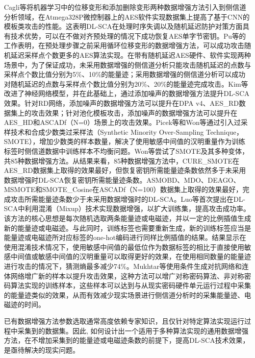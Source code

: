 {	Cagli等\citep{Cagli17}将机器学习中的位移变形和添加删除变形两种数据增强方法引入到侧信道分析领域，在Atmega328P微控制器上的AES软件实现数据集上提高了基于CNN的模板类攻击的性能。这表明DL-SCA在处理时序失调以及随机延迟防护对策方面具有技术优势，可以在不做对齐预处理的情况下成功恢复AES单字节密钥。Pu等\citep{Pu17}的工作表明，在预处理步骤之前采用循环位移变形的数据增强方法，可以成功攻击随机延迟采样点个数更多的AES算法实现。在带有随机延迟AES硬件、软件实现两种场景中，为了保证成功，未采用数据增强的侧信道分析只能攻击随机延迟的点数与采样点个数比值分别为5\%、10\%的能量迹；采用数据增强的侧信道分析可以成功对随机延迟的点数与采样点个数比值分别为20\%、20\%的能量迹完成攻击。Kim等\citep{Kim19}改进了神经网络模型，并在此基础上，通过添加噪声的数据增强方法提升DL-SCA效果。针对RD网络，添加噪声的数据增强方法可以提升在DPA v4、AES\_RD数据集上的攻击效果；针对池化模板攻击，添加噪声的数据增强方法可以提升在AES\_HD和ASCADf（N=0）场景上的攻击效果。Picek等\citep{Picek19}和Won等\citep{Won20}通过引入过采样技术和合成少数类过采样法（Synthetic Minority Over-Sampling Technique， SMOTE），增加少数类的样本数量，解决了使用敏感中间值的汉明重量作为训练标签时侧信道数据中训练样本不均衡问题。Won等\citep{Won20}尝试了SMOTE及其多种变体，共85种数据增强方法\citep{Kovcs19}。从结果来看，85种数据增强方法中，CURE\_SMOTE在AES\_RD数据集上取得的效果最好，但恢复密钥所需能量迹条数依然多于未采用数据增强时DL-SCA恢复密钥所需能量迹条数。ASMOBD、MDO、DEAGO、MSMOTE和SMOTE\_Cosine在ASCADf（N=100）数据集上取得的效果最好，完成攻击所需能量迹条数少于未采用数据增强时的DL-SCA\chenggongtiaoshu 。Luo等\citep{Luo21}首次提出在DL-SCA中利用混淆（Mixup）技术实现数据增强，以扩大训练集，提高攻击成功率。该方法的核心思想是每次随机选取两条能量迹或电磁迹，并以一定的比例插值生成新的能量迹或电磁迹。与此同时，训练标签也需要重新生成，新的训练标签应当是能量迹或电磁迹所对应标签的one-hot编码进行同样比例插值的结果。结果显示在使用混淆技术情况下，使用敏感中间值的最低位作为数据标签的相比于直接使用敏感中间值或敏感中间值的汉明重量可以取得更好的效果，在使用相同数量的能量迹进行攻击的情况下，猜测熵最多减少74\%。Mukhtar等\citep{Mukhtar22}使用条件生成对抗网络和连体网络增广新的样本以提升攻击效果，这种方法可以增广对称密码算法、非对称密码算法实现的训练样本，这些样本可以达到与从现实密码硬件单元运行过程中采集的能量迹类似的效果，从而有效减少现实场景进行侧信道分析时的采集能量迹、电磁迹的时间。
	
	已有数据增强方法参数选取通常高度依赖专家知识，且仅针对特定算法实现运行过程中采集到的数据集。因此, 如何设计出一个适用于多种算法实现的通用数据增强方法，在不增加采集到的能量迹或电磁迹条数的前提下，提高DL-SCA技术效果，是亟待解决的现实问题。
	
}
